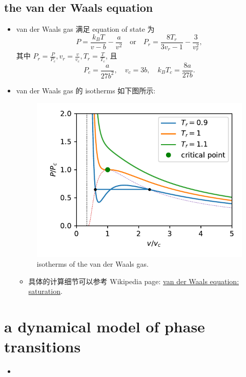 \subsection{the van der Waals equation}
\begin{itemize}
	\item van der Waals gas 满足 equation of state 为
	\begin{equation}
		P = \frac{k_B T}{v - b} - \frac{a}{v^2} \quad \text{or} \quad P_r = \frac{8 T_r}{3 v_r - 1} - \frac{3}{v_r^2},
	\end{equation}
	其中 $P_r = \frac{P}{P_c}, v_r = \frac{v}{v_c}, T_r = \frac{T}{T_c}$, 且
	\begin{equation}
		P_c = \frac{a}{27 b^2}, \quad v_c = 3 b, \quad k_B T_c = \frac{8 a}{27 b}.
	\end{equation}
	
	\item van der Waals gas 的 isotherms 如下图所示:
	
	\begin{figure}[H]
		\centering
		\includegraphics[scale=0.8]{figures/isotherms of the van der Waals gas.pdf}
		\caption{isotherms of the van der Waals gas.}
	\end{figure}
	
	\begin{itemize}
		\item 具体的计算细节可以参考 Wikipedia page: \href{https://en.wikipedia.org/wiki/Van_der_Waals_equation#Saturation}{van der Waals equation: saturation}.
	\end{itemize}
\end{itemize}

\section{a dynamical model of phase transitions}
\begin{itemize}
	\item 
\end{itemize}
